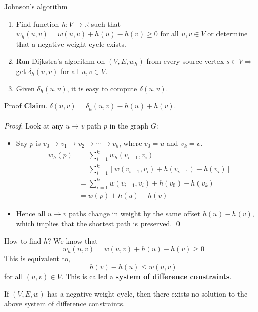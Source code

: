 \documentclass[aspectratio=169]{beamer}
\begin{document}
\begin{frame}{Johnson’s algorithm}
    \begin{enumerate}
        \item Find function $h: V \rightarrow \mathbb{R}$ such that $w_h (u, v) = w(u, v) + h(u) - h(v) \geq 0$ for all $u, v \in V$ or determine that a negative-weight cycle exists.
        \item Run Dijkstra’s algorithm on $(V, E, w_h)$ from every source vertex $s \in V \Rightarrow$ get $\delta_h (u, v)$ for all $u, v \in V$.
        \item Given $\delta_h (u, v)$, it is easy to compute $\delta(u, v)$.
    \end{enumerate}
\end{frame}

\begin{frame}{Proof}
    \textbf{Claim}. $\delta(u, v) = \delta_h (u, v) - h(u) + h(v)$. \\
    \\
    \textit{Proof}. Look at any $u \rightarrow v$ path $p$ in the graph $G$:
    \begin{itemize}
        \footnotesize
        \item Say $p$ is $v_0 \rightarrow v_1 \rightarrow v_2 \rightarrow \cdots \rightarrow v_k$, where $v_0 = u$ and $v_k = v$.
        \begin{equation*}
            \begin{align*}
                w_h (p) &= \sum_{i = 1}^{k} w_h (v_{i - 1}, v_i) \\
                        &= \sum_{i = 1}^{k} [w(v_{i - 1}, v_i) + h(v_{i-1}) - h(v_i)] \\
                        &= \sum_{i = 1}^{k} w(v_{i - 1}, v_i) + h(v_0) - h(v_k) \\
                        &= w(p) + h(u) - h(v)
            \end{align*}
        \end{equation*}
        \item Hence all $u \rightarrow v$ paths change in weight by the same oﬀset $h(u) - h(v)$, which implies that the shortest path is preserved. \qed
    \end{itemize}
\end{frame}

\begin{frame}{How to ﬁnd $h$?}
    We know that
        $$w_h (u, v) = w(u, v) + h(u) - h(v) \geq 0$$
    This is equivalent to,
        $$h(v) - h(u) \leq w(u, v)$$
    for all $(u, v) \in V$. This is called a \textbf{system of difference constraints}.
    \begin{tcolorbox}[title=Theorem.]
        If $(V, E, w)$ has a negative-weight cycle, then there exists no solution to the above system of difference constraints.
    \end{tcolorbox}
\end{frame}
\end{document}
